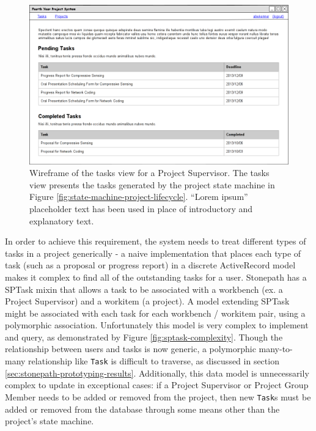 \begin{figure}[!htbp]
\centering \includegraphics[width=6in]{./img/case-study-fourth-year-system/supervisor-tasks-view_wireframe}
\caption{Wireframe of the tasks view for a Project Supervisor. The tasks view presents the tasks generated by the project state machine in Figure \ref{fig:state-machine-project-lifecycle}. ``Lorem ipsum'' placeholder text has been used in place of introductory and explanatory text.}
\label{fig:wireframe-tasks-view}
\end{figure}

In order to achieve this requirement, the system needs to treat different types of tasks in a project generically - a naive implementation that places each type of task (such as a proposal or progress report) in a discrete ActiveRecord model makes it complex to find all of the outstanding tasks for a user. Stonepath has a SPTask mixin that allows a task to be associated with a workbench (ex. a Project Supervisor) and a workitem (a project). A model extending SPTask might be associated with each task for each workbench / workitem pair, using a polymorphic association. Unfortunately this model is very complex to implement and query, as demonstrated by Figure \ref{fig:sptask-complexity}. Though the relationship between users and tasks is now generic, a polymorphic many-to-many relationship like \verb!Task! is difficult to traverse, as discussed in section \ref{sec:stonepath-prototyping-results}. Additionally, this data model is unnecessarily complex to update in exceptional cases: if a Project Supervisor or Project Group Member needs to be added or removed from the project, then new \verb!Task!s must be added or removed from the database through some means other than the project’s state machine.

